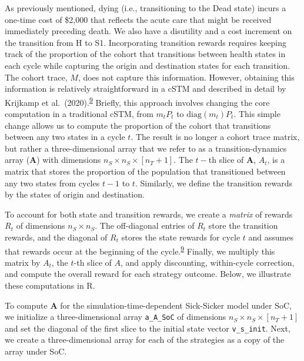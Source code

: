 \documentclass[
]{article}
\begin{document}
As previously mentioned, dying (i.e., transitioning to the Dead state) incurs a one-time cost of \$2,000 that reflects the acute care that might be received immediately preceding death. We also have a disutility and a cost increment on the transition from H to S1. Incorporating transition rewards requires keeping track of the proportion of the cohort that transitions between health states in each cycle while capturing the origin and destination states for each transition. The cohort trace, \(M\), does not capture this information. However, obtaining this information is relatively straightforward in a cSTM and described in detail by Krijkamp et al.~(2020).\textsuperscript{\protect\hyperlink{ref-Krijkamp2019}{9}} Briefly, this approach involves changing the core computation in a traditional cSTM, from \(m_t P_t\) to \(\text{diag}(m_t) P_t\). This simple change allows us to compute the proportion of the cohort that transitions between any two states in a cycle \(t\). The result is no longer a cohort trace matrix, but rather a three-dimensional array that we refer to as a transition-dynamics array (\(\mathbf{A}\)) with dimensions \(n_S \times n_S \times [n_T+1]\). The \(t-\)th slice of \(\mathbf{A}\), \(A_t\), is a matrix that stores the proportion of the population that transitioned between any two states from cycles \(t-1\) to \(t\). Similarly, we define the transition rewards by the states of origin and destination.

To account for both state and transition rewards, we create a \emph{matrix} of rewards \(R_t\) of dimensions \(n_S \times n_S\). The off-diagonal entries of \(R_t\) store the transition rewards, and the diagonal of \(R_t\) stores the state rewards for cycle \(t\) and assumes that rewards occur at the beginning of the cycle.\textsuperscript{\protect\hyperlink{ref-Krijkamp2019}{9}} Finally, we multiply this matrix by \(A_t\), the \(t\)-th slice of \(A\), and apply discounting, within-cycle correction, and compute the overall reward for each strategy outcome. Below, we illustrate these computations in R.

To compute \(\mathbf{A}\) for the simulation-time-dependent Sick-Sicker model under SoC, we initialize a three-dimensional array \texttt{a\_A\_SoC} of dimensions \(n_S \times n_S \times [n_T+1]\) and set the diagonal of the first slice to the initial state vector \texttt{v\_s\_init}. Next, we create a three-dimensional array for each of the strategies as a copy of the array under SoC.
\end{document}
